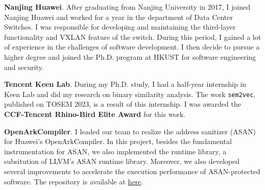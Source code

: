\textbf{Nanjing Huawei}.
After graduating from Nanjing University in 2017, I joined Nanjing Huawei and
worked for a year in the department of Data Center Switches. I was responsible for
developing and maintaining the third-layer functionality and VXLAN feature of
the switch. During this period, I gained a lot of experience in the challenges
of software development. I then decide to pursue a higher degree and joined
the Ph.D. program at HKUST for software engineering and security.

\smallskip
\textbf{Tencent Keen Lab}.
During my Ph.D. study, I had a half-year internship in Keen Lab and did my
research on binary similarity analysis. The work \texttt{sem2vec}, published
on TOSEM 2023, is a result of this internship.
I was awarded the \textbf{CCF-Tencent Rhino-Bird Elite Award} for this work.

\smallskip
\textbf{OpenArkCompiler}.
I leaded our team to realize the address sanitizer (ASAN) for Huawei's
OpenArkCompiler. In this project, besides the fundamental instrumentation
for ASAN, we also implemented the runtime library, a subsitution of LLVM's ASAN
runtime library. Moreover, we also developed several improvements to
accelerate the execution performance of ASAN-protected software.
The repository is available at
\href{https://gitee.com/openarkcompiler/OpenArkCompiler/tree/master/src/mapleall/maple\_san}{here}.
